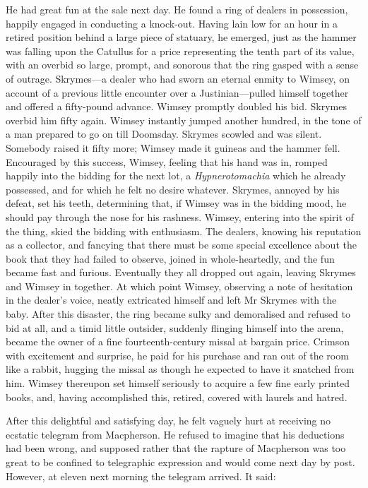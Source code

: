 He had great fun at the sale next day. He found a ring of dealers in possession, happily engaged in conducting a knock-out. Having lain low for an hour in a retired position behind a large piece of statuary, he emerged, just as the hammer was falling upon the Catullus for a price representing the tenth part of its value, with an overbid so large, prompt, and sonorous that the ring gasped with a sense of outrage. Skrymes—a dealer who had sworn an eternal enmity to Wimsey, on account of a previous little encounter over a Justinian—pulled himself together and offered a fifty-pound advance. Wimsey promptly doubled his bid. Skrymes overbid him fifty again. Wimsey instantly jumped another hundred, in the tone of a man prepared to go on till Doomsday. Skrymes scowled and was silent. Somebody raised it fifty more; Wimsey made it guineas and the hammer fell. Encouraged by this success, Wimsey, feeling that his hand was in, romped happily into the bidding for the next lot, a \textit{Hypnerotomachia} which he already possessed, and for which he felt no desire whatever. Skrymes, annoyed by his defeat, set his teeth, determining that, if Wimsey was in the bidding mood, he should pay through the nose for his rashness. Wimsey, entering into the spirit of the thing, skied the bidding with enthusiasm. The dealers, knowing his reputation as a collector, and fancying that there must be some special excellence about the book that they had failed to observe, joined in whole-heartedly, and the fun became fast and furious. Eventually they all dropped out again, leaving Skrymes and Wimsey in together. At which point Wimsey, observing a note of hesitation in the dealer's voice, neatly extricated himself and left Mr Skrymes with the baby. After this disaster, the ring became sulky and demoralised and refused to bid at all, and a timid little outsider, suddenly flinging himself into the arena, became the owner of a fine fourteenth-century missal at bargain price. Crimson with excitement and surprise, he paid for his purchase and ran out of the room like a rabbit, hugging the missal as though he expected to have it snatched from him. Wimsey thereupon set himself seriously to acquire a few fine early printed books, and, having accomplished this, retired, covered with laurels and hatred.

After this delightful and satisfying day, he felt vaguely hurt at receiving no ecstatic telegram from Macpherson. He refused to imagine that his deductions had been wrong, and supposed rather that the rapture of Macpherson was too great to be confined to telegraphic expression and would come next day by post. However, at eleven next morning the telegram arrived. It said:

